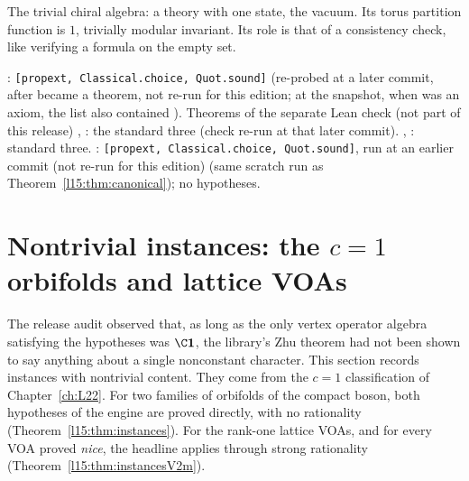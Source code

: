 \begin{physics}
The trivial chiral algebra: a theory with one state, the vacuum. Its torus partition function is $1$, trivially modular
invariant. Its role is that of a consistency check, like verifying a formula on the empty set.
\end{physics}

\begin{status}
\allowbreak{}: \texttt{[propext, Classical.choice, Quot.sound]} (re-probed at a later commit, after  became a theorem, not re-run for this edition;
at the snapshot, when  was an axiom, the list also contained ). Theorems of the separate Lean check (not part of this release)
\allowbreak{}, \allowbreak{}: the
standard three (check re-run at that later commit).
\allowbreak{}, : standard three.
\allowbreak{}: \texttt{[propext, Classical.choice, Quot.sound]}, run at
an earlier commit (not re-run for this edition) (same scratch run as Theorem~\ref{l15:thm:canonical}); no hypotheses.
\end{status}

\section{Nontrivial instances: the \texorpdfstring{$c=1$}{c=1} orbifolds and lattice VOAs}\label{l15:sec:instances}

The release audit observed that, as long as the only vertex operator algebra satisfying the hypotheses was $\C\lfifteenvac$,
the library's Zhu theorem had not been shown to say anything about a single nonconstant character. This section records
instances with nontrivial content. They come from the $c=1$ classification of Chapter~\ref{ch:L22}. For two families of
orbifolds of the compact boson, both hypotheses of the engine are proved directly, with no rationality
(Theorem~\ref{l15:thm:instances}). For the rank-one lattice VOAs, and for every VOA proved \emph{nice}, the headline applies
through strong rationality (Theorem~\ref{l15:thm:instancesV2m}).

